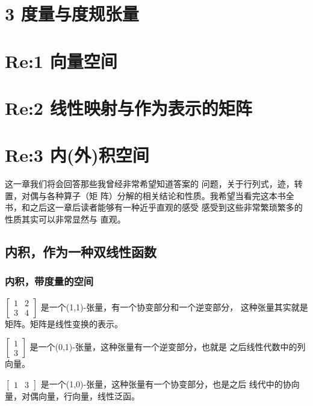 \documentclass{book}
\begin{document}
\begin{CJK}{UTF8}{gbsn}
    \chapter{3 度量与度规张量}

    \chapter{Re:1 向量空间}

    \chapter{Re:2 线性映射与作为表示的矩阵}

    \chapter{Re:3 内(外)积空间}

    这一章我们将会回答那些我曾经非常希望知道答案的
    问题，关于行列式，迹，转置，对偶与各种算子（矩
    阵）分解的相关结论和性质。我希望当看完这本书全
    书，和之后这一章后读者能够有一种近乎直观的感受
    感受到这些非常繁琐繁多的性质其实可以非常显然与
    直观。

    \section{内积，作为一种双线性函数}
    \subsection{内积，带度量的空间}

    $\left[\begin{matrix}
                1 & 2 \\
                3 & 4
            \end{matrix}\right]$
    是一个(1,1)-张量，有一个协变部分和一个逆变部分，
    这种张量其实就是矩阵。矩阵是线性变换的表示。

    $\left[\begin{matrix}
                1 \\
                3
            \end{matrix}\right]$
    是一个(0,1)-张量，这种张量有一个逆变部分，也就是
    之后线性代数中的列向量。

    $\left[\begin{matrix}
                1 & 3
            \end{matrix}\right]$
    是一个(1,0)-张量，这种张量有一个协变部分，也是之后
    线代中的协向量，对偶向量，行向量，线性泛函。


\end{CJK}
\end{document}
